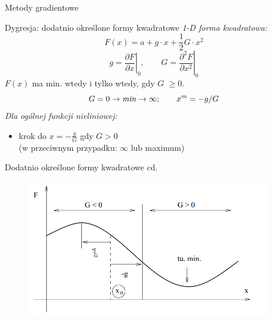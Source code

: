   \begin{frame}{Metody gradientowe}

    \begin{block}{Dygresja: dodatnio określone formy kwadratowe}
      \emph{1-D forma kwadratowa:}
	  \begin{equation}
	  	F(x) = a + g \cdot x + \frac{1}{2} G \cdot x^2
      \nonumber
	  \end{equation}
    \begin{equation}
      g = \left.\frac{\partial F}{\partial x}\right|_{0}{,}\qquad
      G = \left.\frac{\partial^{2} F}{\partial x^2}\right|_{0}
      \nonumber
    \end{equation}
	  $F(x)$ ma min. wtedy i tylko wtedy, gdy $G$ $\geq 0$.
    \begin{equation}
	  		G = 0 \rightarrow \text{\emph{min}} \rightarrow \infty; \qquad
        x^m = -g/G
        \nonumber
	  \end{equation}
	  \emph{Dla ogólnej funkcji nieliniowej:}
	  \smallskip
	  \begin{itemize}
	  	    \item krok do $x = - \frac{g}{G}$ gdy $G > 0$
	  	    \\(w przeciwnym przypadku: $\infty$ lub maximum)
	  \end{itemize}
	\end{block}

  \end{frame}

  \begin{frame}{Dodatnio określone formy kwadratowe cd.}

    \begin{figure}
		\centering
		\includegraphics[width=0.95\textwidth]{img/17/dygresja}
	\end{figure}

  \end{frame}

